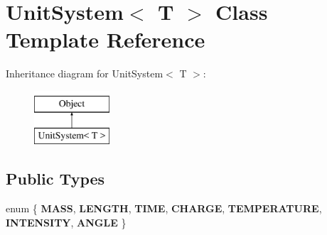 \hypertarget{classUnitSystem}{}\section{Unit\+System$<$ T $>$ Class Template Reference}
\label{classUnitSystem}
Inheritance diagram for Unit\+System$<$ T $>$\+:\begin{figure}[H]
\begin{center}
\leavevmode
\includegraphics[height=2.000000cm]{classUnitSystem}
\end{center}
\end{figure}
\subsection*{Public Types}
\begin{DoxyCompactItemize}
\item 
\hypertarget{classUnitSystem_abc46352f4e4e21dc9bb2f63a9c416abf}{}\label{classUnitSystem_abc46352f4e4e21dc9bb2f63a9c416abf} 
enum \{ \newline
{\bfseries M\+A\+SS}, 
{\bfseries L\+E\+N\+G\+TH}, 
{\bfseries T\+I\+ME}, 
{\bfseries C\+H\+A\+R\+GE}, 
\newline
{\bfseries T\+E\+M\+P\+E\+R\+A\+T\+U\+RE}, 
{\bfseries I\+N\+T\+E\+N\+S\+I\+TY}, 
{\bfseries A\+N\+G\+LE}
 \}
\end{DoxyCompactItemize}
